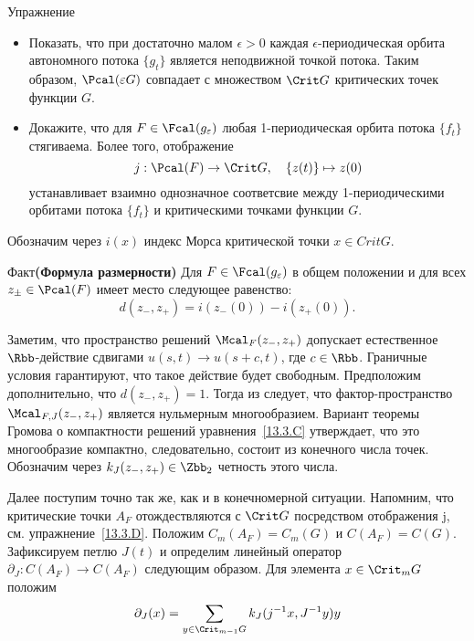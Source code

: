 \begin{ex}{Упражнение}\label{13.3.D}
  \begin{itemize}
  \item
    Показать, что при достаточно малом $\epsilon > 0$ каждая
    $\epsilon$-пе\-ри\-оди\-чес\-кая орбита автономного потока $\{g_{t}\}$
    является неподвижной точкой потока. Таким образом, $\Pcal(\epsilon
    G)$ совпадает с множеством $\Crit G$ критических точек функции $G$.
  \item
    Докажите, что для $F\in\Fcal(g_{\epsilon})$ любая 1-периодическая
    орбита потока $\{f_{t}\}$ стягиваема. 
    Более того, отображение
    \[
    j : \Pcal(F)\to\Crit G,
    \quad
    \{z(t)\}\mapsto z(0)
    \]
    устанавливает взаимно однозначное соответсвие между
    1-пе\-ри\-оди\-чес\-ки\-ми орбитами потока $\{f_{t}\}$ и критическими
    точками функции $G$.
  \end{itemize}
\end{ex}

Обозначим через $i(x)$ индекс Морса критической точки $x\in Crit G$.
\begin{thm}{Факт}\label{13.3.E}\textbf{(Формула размерности)}
  Для $F\in\Fcal(g_{\epsilon})$ в общем положении и для всех
  $z_{\pm}\in\Pcal(F)$ имеет место следующее равенство:
  \[
  d(z_{-}, z_{+}) = i(z_{-}(0)) - i(z_{+}(0)).
  \]
\end{thm}

Заметим, что пространство решений $\Mcal_{F}(z_{-},z_{+})$ допускает
естественное $\Rbb$-действие сдвигами $u(s, t)\to u(s+c, t)$, где
$c\in\Rbb$.
Граничные условия гарантируют, что такое действие будет свободным.
Предположим дополнительно, что $d(z_{-}, z_{+}) = 1$.
Тогда из  следует, что
фактор-пространство $\Mcal_{F,J}(z_{-},z_{+})$ является нульмерным
многообразием.
Вариант теоремы Громова о компактности решений
уравнения~\ref{13.3.C} утверждает, что это многообразие компактно,
следовательно, состоит из конечного числа точек.
Обозначим через $k_{J}(z_{-},z_{+})\in\Zbb_{2}$ четность этого числа.

Далее поступим точно так же, как и в конечномерной ситуации.
Напомним, что критические точки $A_{F}$ отождествляются с $\Crit G$ посредством отображения j, см. упражнение~\ref{13.3.D}.
Положим $C_{m}(A_{F}) = C_{m}(G)$ и $C(A_{F}) = C(G)$.
Зафиксируем петлю $J(t)$ и определим линейный оператор
$\partial_{J}:C(A_{F})\to C(A_{F})$ следующим образом.
Для элемента $x\in\Crit_{m} G$ положим
\[
\partial_{J}(x)=\sum_{y\in\Crit_{m-1}G}k_{J}(j^{-1}x,J^{-1}y)y
\]


